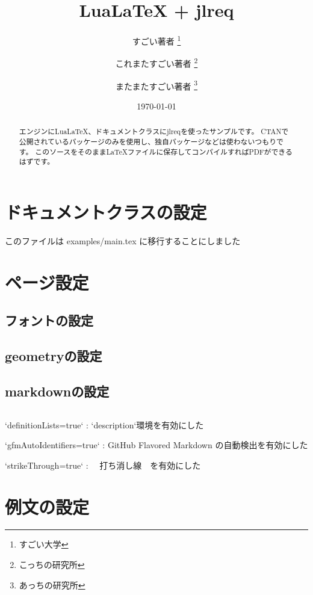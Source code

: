 \documentclass[
    article,
    head_space=25truemm,
    foot_space=10truemm,
    gutter=15truemm]{jlreq}
\title{LuaLaTeX + jlreq}
\author{
    すごい著者 \thanks{すごい大学} \\ \and
    これまたすごい著者 \thanks{こっちの研究所} \\ \and
    またまたすごい著者 \thanks{あっちの研究所}
}
\date{\today}
\begin{document}
\maketitle

\begin{abstract}
エンジンにLuaLaTeX、ドキュメントクラスにjlreqを使ったサンプルです。
CTANで公開されているパッケージのみを使用し、独自パッケージなどは使わないつもりです。
このソースをそのままLaTeXファイルに保存してコンパイルすればPDFができるはずです。
\end{abstract}

\tableofcontents

\section{ドキュメントクラスの設定}

このファイルは examples/main.tex に移行することにしました





\section{ページ設定}

\subsection{フォントの設定}

\subsection{geometryの設定}

\subsection{markdownの設定}

\inputminted{latex}{preamble/markdown.tex}

\begin{markdown}
`definitionLists=true`
: `description`環境を有効にした

`gfmAutoIdentifiers=true`
: GitHub Flavored Markdown の自動検出を有効にした

`strikeThrough=true`
: ~~打ち消し線~~を有効にした
\end{markdown}

\section{例文の設定}
\end{document}

